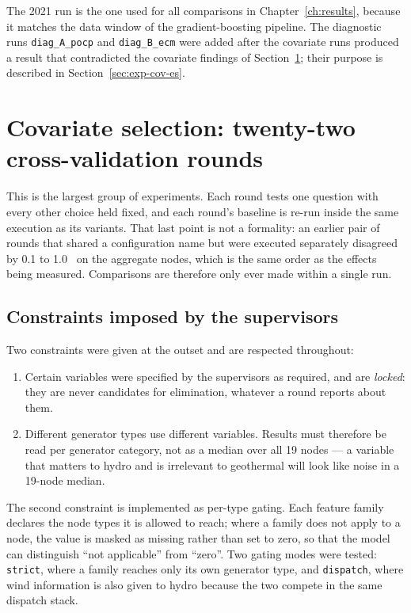 The 2021 run is the one used for all comparisons in Chapter~\ref{ch:results}, because it
matches the data window of the gradient-boosting pipeline. The diagnostic runs
\verb+diag_A_pocp+ and \verb+diag_B_ecm+ were added after the covariate runs produced a
result that contradicted the covariate findings of Section~\ref{sec:exp-cov}; their purpose
is described in Section~\ref{sec:exp-cov-es}.

\section{Covariate selection: twenty-two cross-validation rounds}
\label{sec:exp-cov}

This is the largest group of experiments. Each round tests one question with every other
choice held fixed, and each round's baseline is re-run inside the same execution as its
variants. That last point is not a formality: an earlier pair of rounds that shared a
configuration name but were executed separately disagreed by 0.1 to 1.0~\pp{} on the
aggregate nodes, which is the same order as the effects being measured. Comparisons are
therefore only ever made within a single run.

\subsection{Constraints imposed by the supervisors}

Two constraints were given at the outset and are respected throughout:

\begin{enumerate}
\item Certain variables were specified by the supervisors as required, and are
\emph{locked}: they are never candidates for elimination, whatever a round reports about
them.
\item Different generator types use different variables. Results must therefore be read
per generator category, not as a median over all 19 nodes --- a variable that matters to
hydro and is irrelevant to geothermal will look like noise in a 19-node median.
\end{enumerate}

The second constraint is implemented as per-type gating. Each feature family declares the
node types it is allowed to reach; where a family does not apply to a node, the value is
masked as missing rather than set to zero, so that the model can distinguish
``not applicable'' from ``zero''. Two gating modes were tested: \verb+strict+, where a
family reaches only its own generator type, and \verb+dispatch+, where wind information is
also given to hydro because the two compete in the same dispatch stack.

